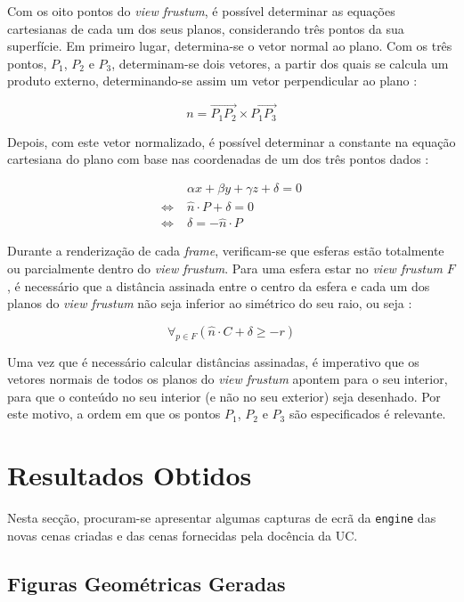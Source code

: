 \documentclass[12pt, a4paper]{article}
\begin{document}
Com os oito pontos do \emph{view frustum}, é possível determinar as equações cartesianas de cada
um dos seus planos, considerando três pontos da sua superfície. Em primeiro lugar, determina-se o
vetor normal ao plano. Com os três pontos, $P_1$, $P_2$ e $P_3$, determinam-se dois vetores, a
partir dos quais se calcula um produto externo, determinando-se assim um vetor perpendicular ao
plano \cite{lighthouse3d-plane}:

$$
n = \overrightarrow{P_1 P_2} \times \overrightarrow{P_1 P_3}
$$

Depois, com este vetor normalizado, é possível determinar a constante na equação cartesiana do plano
com base nas coordenadas de um dos três pontos dados \cite{lighthouse3d-plane}:

\begin{align*}
                       & \alpha x + \beta y + \gamma z + \delta = 0 \\
    \Leftrightarrow \; & \widehat{n} \cdot P + \delta = 0 \\
    \Leftrightarrow \; & \delta = -\widehat{n} \cdot P
\end{align*}

Durante a renderização de cada \emph{frame}, verificam-se que esferas estão totalmente ou
parcialmente dentro do \emph{view frustum}. Para uma esfera estar no \emph{view frustum} $F$, é
necessário que a distância assinada entre o centro da esfera e cada um dos planos do
\emph{view frustum} não seja inferior ao simétrico do seu raio, ou seja \cite{lighthouse3d-sphere}:

$$
\forall_{p \in F} \left ( \widehat{n} \cdot C + \delta \ge - r \right )
$$

Uma vez que é necessário calcular distâncias assinadas, é imperativo que os vetores normais de todos
os planos do \emph{view frustum} apontem para o seu interior, para que o conteúdo no seu interior (e
não no seu exterior) seja desenhado. \cite{lighthouse3d-frustum-planes} Por este motivo, a ordem em
que os pontos $P_1$, $P_2$ e $P_3$ são especificados é relevante.

\section{Resultados Obtidos}

Nesta secção, procuram-se apresentar algumas capturas de ecrã da \texttt{engine} das novas cenas
criadas e das cenas fornecidas pela docência da UC.

\subsection{Figuras Geométricas Geradas}
\end{document}
